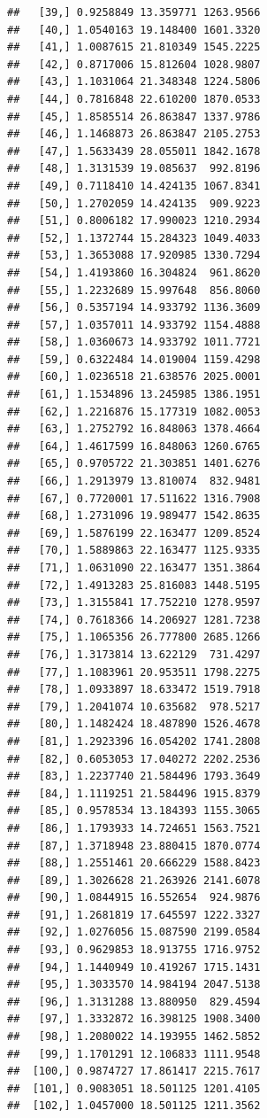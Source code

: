 \documentclass[article]{jss}\usepackage[]{graphicx}\usepackage[]{xcolor}
\makeatletter
\newenvironment{kframe}{%
 \def\at@end@of@kframe{}%
 \ifinner\ifhmode%
  \def\at@end@of@kframe{\end{minipage}}%
  \begin{minipage}{\columnwidth}%
 \fi\fi%
 \def\FrameCommand##1{\hskip\@totalleftmargin \hskip-\fboxsep
 \colorbox{shadecolor}{##1}\hskip-\fboxsep
     \hskip-\linewidth \hskip-\@totalleftmargin \hskip\columnwidth}%
 \MakeFramed {\advance\hsize-\width
   \@totalleftmargin\z@ \linewidth\hsize
   \@setminipage}}%
 {\par\unskip\endMakeFramed%
 \at@end@of@kframe}
\newenvironment{knitrout}{}{} %
\makeatother
\begin{document}
\begin{knitrout}
\begin{kframe}
\begin{verbatim}
##   [39,] 0.9258849 13.359771 1263.9566
##   [40,] 1.0540163 19.148400 1601.3320
##   [41,] 1.0087615 21.810349 1545.2225
##   [42,] 0.8717006 15.812604 1028.9807
##   [43,] 1.1031064 21.348348 1224.5806
##   [44,] 0.7816848 22.610200 1870.0533
##   [45,] 1.8585514 26.863847 1337.9786
##   [46,] 1.1468873 26.863847 2105.2753
##   [47,] 1.5633439 28.055011 1842.1678
##   [48,] 1.3131539 19.085637  992.8196
##   [49,] 0.7118410 14.424135 1067.8341
##   [50,] 1.2702059 14.424135  909.9223
##   [51,] 0.8006182 17.990023 1210.2934
##   [52,] 1.1372744 15.284323 1049.4033
##   [53,] 1.3653088 17.920985 1330.7294
##   [54,] 1.4193860 16.304824  961.8620
##   [55,] 1.2232689 15.997648  856.8060
##   [56,] 0.5357194 14.933792 1136.3609
##   [57,] 1.0357011 14.933792 1154.4888
##   [58,] 1.0360673 14.933792 1011.7721
##   [59,] 0.6322484 14.019004 1159.4298
##   [60,] 1.0236518 21.638576 2025.0001
##   [61,] 1.1534896 13.245985 1386.1951
##   [62,] 1.2216876 15.177319 1082.0053
##   [63,] 1.2752792 16.848063 1378.4664
##   [64,] 1.4617599 16.848063 1260.6765
##   [65,] 0.9705722 21.303851 1401.6276
##   [66,] 1.2913979 13.810074  832.9481
##   [67,] 0.7720001 17.511622 1316.7908
##   [68,] 1.2731096 19.989477 1542.8635
##   [69,] 1.5876199 22.163477 1209.8524
##   [70,] 1.5889863 22.163477 1125.9335
##   [71,] 1.0631090 22.163477 1351.3864
##   [72,] 1.4913283 25.816083 1448.5195
##   [73,] 1.3155841 17.752210 1278.9597
##   [74,] 0.7618366 14.206927 1281.7238
##   [75,] 1.1065356 26.777800 2685.1266
##   [76,] 1.3173814 13.622129  731.4297
##   [77,] 1.1083961 20.953511 1798.2275
##   [78,] 1.0933897 18.633472 1519.7918
##   [79,] 1.2041074 10.635682  978.5217
##   [80,] 1.1482424 18.487890 1526.4678
##   [81,] 1.2923396 16.054202 1741.2808
##   [82,] 0.6053053 17.040272 2202.2536
##   [83,] 1.2237740 21.584496 1793.3649
##   [84,] 1.1119251 21.584496 1915.8379
##   [85,] 0.9578534 13.184393 1155.3065
##   [86,] 1.1793933 14.724651 1563.7521
##   [87,] 1.3718948 23.880415 1870.0774
##   [88,] 1.2551461 20.666229 1588.8423
##   [89,] 1.3026628 21.263926 2141.6078
##   [90,] 1.0844915 16.552654  924.9876
##   [91,] 1.2681819 17.645597 1222.3327
##   [92,] 1.0276056 15.087590 2199.0584
##   [93,] 0.9629853 18.913755 1716.9752
##   [94,] 1.1440949 10.419267 1715.1431
##   [95,] 1.3033570 14.984194 2047.5138
##   [96,] 1.3131288 13.880950  829.4594
##   [97,] 1.3332872 16.398125 1908.3400
##   [98,] 1.2080022 14.193955 1462.5852
##   [99,] 1.1701291 12.106833 1111.9548
##  [100,] 0.9874727 17.861417 2215.7617
##  [101,] 0.9083051 18.501125 1201.4105
##  [102,] 1.0457000 18.501125 1211.3562

\end{verbatim}
\end{kframe}
\end{knitrout}
\end{document}
